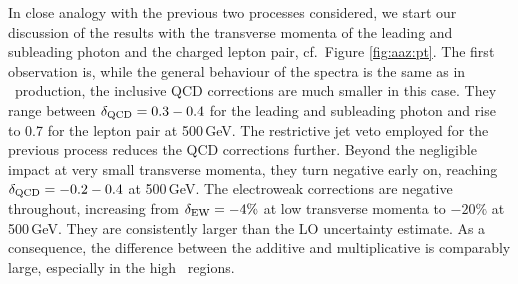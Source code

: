 In close analogy with the previous two processes considered, 
we start our discussion of the results with the transverse 
momenta of the leading and subleading photon and the charged 
lepton pair, cf.\ Figure \ref{fig:aaz:pt}. 
The first observation is, while the general behaviour of the 
spectra is the same as in \aaw\ production, the inclusive QCD 
corrections are much smaller in this case. 
They range between $\delta_\text{QCD}=0.3-0.4$ for the leading and 
subleading photon and rise to 0.7 for the lepton pair at 
500\,GeV. 
The restrictive jet veto employed for the previous process 
reduces the QCD corrections further. 
Beyond the negligible impact at very small transverse 
momenta, they turn negative early on, reaching $\delta_\text{QCD}=-0.2-0.4$ 
at 500\,GeV. 
The electroweak corrections are negative throughout, increasing 
from $\delta_\text{EW}=-4\%$ at low transverse momenta to $-20\%$ at 
500\,GeV.
They are consistently larger than the LO uncertainty estimate. 
As a consequence, the difference between the additive and 
multiplicative is comparably large, especially in the high 
\pT\ regions. 

